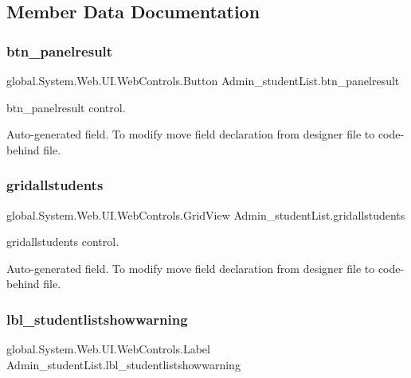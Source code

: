 \subsection{Member Data Documentation}
\mbox{\label{class_admin__student_list_a039b2be6f84419ecc427d475998959a4}} 
\subsubsection{\texorpdfstring{btn\_panelresult}{btn\_panelresult}}
{\footnotesize\ttfamily global.\+System.\+Web.\+U\+I.\+Web\+Controls.\+Button Admin\+\_\+student\+List.\+btn\+\_\+panelresult\hspace{0.3cm}{\ttfamily [protected]}}



btn\+\_\+panelresult control. 

Auto-\/generated field. To modify move field declaration from designer file to code-\/behind file. \mbox{\label{class_admin__student_list_a7980a4f9d42326c584fbdb37ff09f502}} 
\subsubsection{\texorpdfstring{gridallstudents}{gridallstudents}}
{\footnotesize\ttfamily global.\+System.\+Web.\+U\+I.\+Web\+Controls.\+Grid\+View Admin\+\_\+student\+List.\+gridallstudents\hspace{0.3cm}{\ttfamily [protected]}}



gridallstudents control. 

Auto-\/generated field. To modify move field declaration from designer file to code-\/behind file. \mbox{\label{class_admin__student_list_ad279e6a0907b2ea37346fd7c8992d27e}} 
\subsubsection{\texorpdfstring{lbl\_studentlistshowwarning}{lbl\_studentlistshowwarning}}
{\footnotesize\ttfamily global.\+System.\+Web.\+U\+I.\+Web\+Controls.\+Label Admin\+\_\+student\+List.\+lbl\+\_\+studentlistshowwarning\hspace{0.3cm}{\ttfamily [protected]}}



